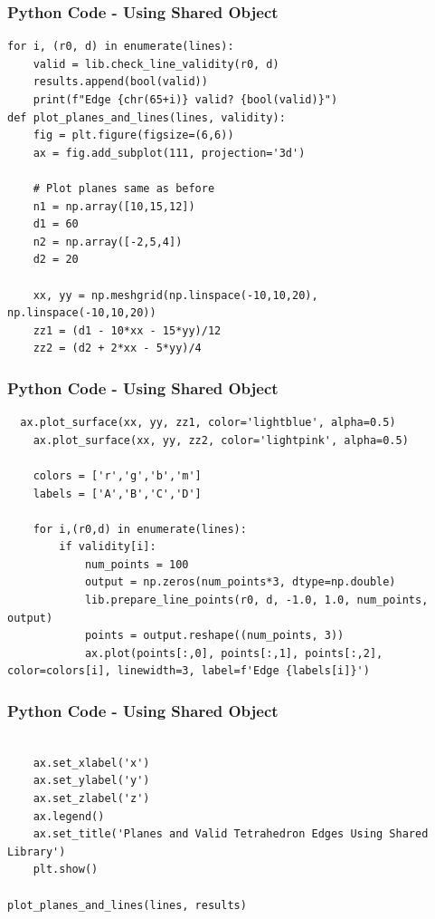 \documentclass{beamer}
\numberwithin{equation}{section}
\begin{document}
\begin{frame}[fragile]
    \frametitle{Python Code - Using Shared Object}
    \begin{lstlisting}
for i, (r0, d) in enumerate(lines):
    valid = lib.check_line_validity(r0, d)
    results.append(bool(valid))
    print(f"Edge {chr(65+i)} valid? {bool(valid)}")
def plot_planes_and_lines(lines, validity):
    fig = plt.figure(figsize=(6,6))
    ax = fig.add_subplot(111, projection='3d')

    # Plot planes same as before
    n1 = np.array([10,15,12])
    d1 = 60
    n2 = np.array([-2,5,4])
    d2 = 20

    xx, yy = np.meshgrid(np.linspace(-10,10,20), np.linspace(-10,10,20))
    zz1 = (d1 - 10*xx - 15*yy)/12
    zz2 = (d2 + 2*xx - 5*yy)/4

\end{lstlisting}
\end{frame}
\begin{frame}[fragile]
    \frametitle{Python Code - Using Shared Object}
    \begin{lstlisting}
  ax.plot_surface(xx, yy, zz1, color='lightblue', alpha=0.5)
    ax.plot_surface(xx, yy, zz2, color='lightpink', alpha=0.5)

    colors = ['r','g','b','m']
    labels = ['A','B','C','D']

    for i,(r0,d) in enumerate(lines):
        if validity[i]:
            num_points = 100
            output = np.zeros(num_points*3, dtype=np.double)
            lib.prepare_line_points(r0, d, -1.0, 1.0, num_points, output)
            points = output.reshape((num_points, 3))
            ax.plot(points[:,0], points[:,1], points[:,2], color=colors[i], linewidth=3, label=f'Edge {labels[i]}')

\end{lstlisting}
\end{frame}
\begin{frame}[fragile]
    \frametitle{Python Code - Using Shared Object}
    \begin{lstlisting}

    ax.set_xlabel('x')
    ax.set_ylabel('y')
    ax.set_zlabel('z')
    ax.legend()
    ax.set_title('Planes and Valid Tetrahedron Edges Using Shared Library')
    plt.show()

plot_planes_and_lines(lines, results)

\end{lstlisting}
\end{frame}
\end{document}
